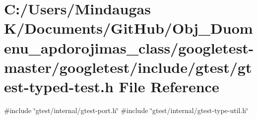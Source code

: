 \hypertarget{googletest-master_2googletest_2include_2gtest_2gtest-typed-test_8h}{}\section{C\+:/\+Users/\+Mindaugas K/\+Documents/\+Git\+Hub/\+Obj\+\_\+\+Duomenu\+\_\+apdorojimas\+\_\+class/googletest-\/master/googletest/include/gtest/gtest-\/typed-\/test.h File Reference}
\label{googletest-master_2googletest_2include_2gtest_2gtest-typed-test_8h}
{\ttfamily \#include \char`\"{}gtest/internal/gtest-\/port.\+h\char`\"{}}\newline
{\ttfamily \#include \char`\"{}gtest/internal/gtest-\/type-\/util.\+h\char`\"{}}\newline
